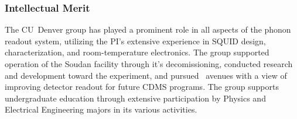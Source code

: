 %
%
%
%
%
%

\subsubsection{Intellectual Merit}
\label{CUDenverResults}

The CU~Denver group has played a prominent role in all aspects of the phonon readout system, utilizing the PI's extensive experience in SQUID design, characterization, and room-temperature electronics. The group supported operation of the \SuperCDMS Soudan facility through it's decomissioning, conducted research and development toward the \scs experiment, and pursued \RnD\ avenues with a view of improving detector readout for future CDMS programs. The group supports undergraduate education through extensive participation by Physics and Electrical Engineering majors in its various activities.

